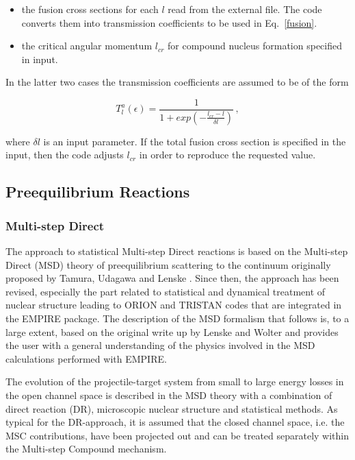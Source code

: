 \documentclass[twocolumn,amsmath,amssymb,10pt,groupedaddress,a4paper]{revtex4}
\begin{document}
\begin{itemize}
\item the fusion cross sections for each $l$ read from the external
file. The code converts them into transmission
coefficients to be used in Eq.~\ref{fusion}. \\
\item the critical angular momentum $l_{cr}$ for compound nucleus
formation specified in input.
\end{itemize}

In the latter two cases the transmission coefficients are assumed
to be of the form

\begin{equation}
T_{l}^{a}(\epsilon)=\frac{1}{1+exp(-\frac{l_{cr}-l}{\delta l})}\,,\label{Tlfus}
\end{equation}

\noindent where $\delta l$ is an input parameter. If the total fusion
cross section is specified in the input, then the code adjusts $l_{cr}$
in order to reproduce the requested value.


\subsection{Preequilibrium Reactions}

\subsubsection{Multi-step Direct\label{sec: MSD}}


The approach to statistical Multi-step Direct reactions
is based on the Multi-step Direct (MSD) theory of preequilibrium scattering
to the continuum originally proposed by Tamura, Udagawa and Lenske
\cite{TUL}. Since then, the approach has been revised, especially
the part related to statistical and dynamical treatment of nuclear
structure leading to ORION and TRISTAN codes that are integrated in
the EMPIRE package. The description of the MSD formalism that follows
is, to a large extent, based on the original write up by Lenske and Wolter and
provides the user with a general understanding of the physics involved
in the MSD calculations performed with EMPIRE.

The evolution of the projectile-target system from small to large
energy losses in the open channel space is described in the MSD theory
with a combination of direct reaction (DR), microscopic nuclear structure
and statistical methods. As typical for the DR-approach, it is assumed
that the closed channel space, i.e. the MSC contributions,
have been projected out and can be treated separately within the Multi-step
Compound mechanism.
\end{document}
